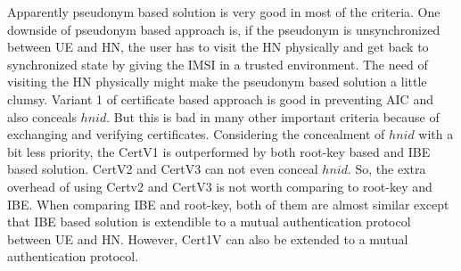 \documentclass{llncs} %
\begin{document}
Apparently pseudonym based solution is very good in most of the criteria. One downside of pseudonym based approach is, if the pseudonym is unsynchronized between UE and HN, the user has to visit the HN physically and get back to synchronized state by giving the IMSI in a trusted environment. The need of visiting the HN physically might make the pseudonym based solution a little clumsy. Variant 1 of certificate based approach is good in preventing AIC and also conceals $hnid$. But this is bad in many other important criteria because of exchanging and verifying certificates. Considering the concealment of $hnid$ with a bit less priority, the CertV1 is outperformed by both root-key based and IBE based solution. CertV2 and CertV3 can not even conceal $hnid$. So, the extra overhead of using Certv2 and CertV3 is not worth comparing to root-key and IBE. When comparing IBE and root-key, both of them are almost similar except that IBE based solution is extendible to a mutual authentication protocol between UE and HN. However, Cert1V can also be extended to a mutual authentication protocol. 
\end{document}
